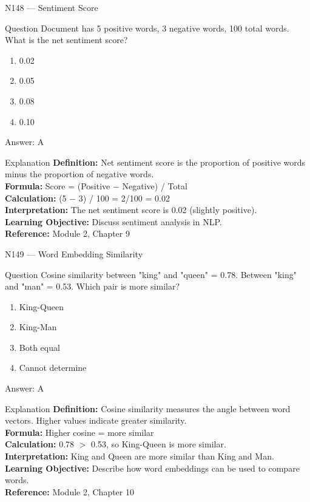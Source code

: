 \documentclass[aspectratio=169,8pt]{beamer}
\begin{document}
	\begin{frame}{N148 --- Sentiment Score}
		\begin{block}{Question}
			Document has 5 positive words, 3 negative words, 100 total words. What is the net sentiment score?
			\begin{enumerate}
				\item 0.02
				\item 0.05
				\item 0.08
				\item 0.10
			\end{enumerate}
		\end{block}
		\begin{exampleblock}{Answer: A}\end{exampleblock}
		\begin{block}{Explanation}
			\textbf{Definition:} Net sentiment score is the proportion of positive words minus the proportion of negative words.\\
			\textbf{Formula:} Score = (Positive $-$ Negative) / Total\\
			\textbf{Calculation:} (5 $-$ 3) / 100 = 2/100 = 0.02\\
			\textbf{Interpretation:} The net sentiment score is 0.02 (slightly positive).\\
			\textbf{Learning Objective:} Discuss sentiment analysis in NLP.\\
			\textbf{Reference:} Module 2, Chapter 9
		\end{block}
	\end{frame}
	
	\begin{frame}{N149 --- Word Embedding Similarity}
		\begin{block}{Question}
			Cosine similarity between "king" and "queen" = 0.78. Between "king" and "man" = 0.53. Which pair is more similar?
			\begin{enumerate}
				\item King-Queen
				\item King-Man
				\item Both equal
				\item Cannot determine
			\end{enumerate}
		\end{block}
		\begin{exampleblock}{Answer: A}\end{exampleblock}
		\begin{block}{Explanation}
			\textbf{Definition:} Cosine similarity measures the angle between word vectors. Higher values indicate greater similarity.\\
			\textbf{Formula:} Higher cosine = more similar\\
			\textbf{Calculation:} 0.78 $>$ 0.53, so King-Queen is more similar.\\
			\textbf{Interpretation:} King and Queen are more similar than King and Man.\\
			\textbf{Learning Objective:} Describe how word embeddings can be used to compare words.\\
			\textbf{Reference:} Module 2, Chapter 10
		\end{block}
	\end{frame}
	
\end{document}
